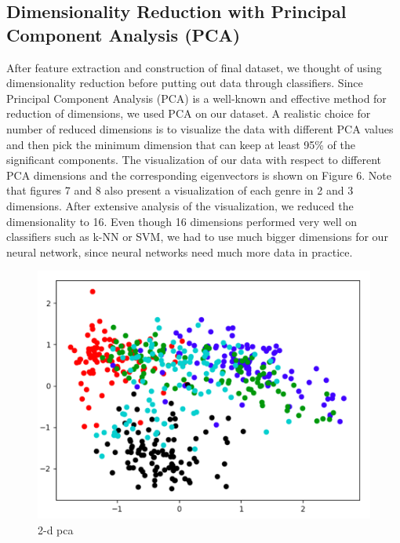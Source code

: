 \subsection{Dimensionality Reduction with Principal Component Analysis (PCA)}
After feature extraction and construction of final dataset, we thought of using dimensionality reduction before putting out data through classifiers. Since Principal Component Analysis (PCA) is a well-known and effective method for reduction of dimensions, we used PCA on our dataset. A realistic choice for number of reduced dimensions is to visualize the data with different PCA values and then pick the minimum dimension that can keep at least 95\% of the significant components. The visualization of our data with respect to different PCA dimensions and the corresponding eigenvectors is shown on Figure 6. Note that figures 7 and 8 also present a visualization of each genre in 2 and 3 dimensions. After extensive analysis of the visualization, we reduced the dimensionality to 16. Even though 16 dimensions performed very well on classifiers such as k-NN or SVM, we had to use much bigger dimensions for our neural network, since neural networks need much more data in practice. 


\begin{figure}
\begin{center}
\includegraphics[scale=0.3]{./figures/2_d_plot.png}
\end{center}
\caption
{
2-d pca
}
\label{fig:big_picture5}
\end{figure}

